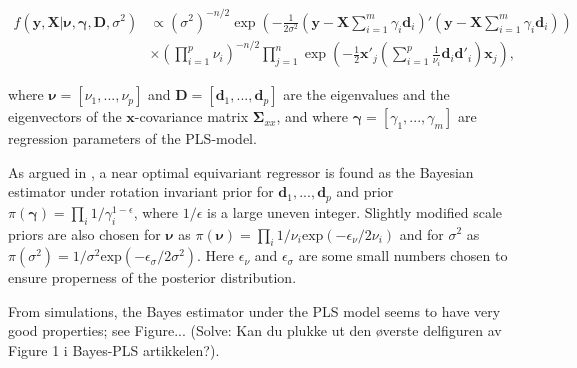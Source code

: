 \documentclass[a4paper, 11pt]{article}
\begin{document}
\begin{equation}
  \label{likelihood}
  \begin{split}
    f(\bm{y},\bm{X}|\bm{\nu}, \bm{\gamma}, \bm{D},\sigma^2) &\propto (\sigma^2)^{-n/2}
    \exp\left(-\frac{1}{2\sigma^2}(\bm{y}-\bm{X}\sum_{i=1}^{m}\gamma_i \bm{d}_i)'(\bm{y}-\bm{X}\sum_{i=1}^{m}\gamma_i \bm{d}_i)\right)\\
    &\times (\prod_{i=1}^{p}\nu_i)^{-n/2}\prod_{j=1}^{n}\exp\left(-\frac{1}{2} \bm{x}'_j(\sum_{i=1}^{p}\frac{1}{\nu_i}\bm{d}_i \bm{d}'_i)\bm{x}_j  \right),
  \end{split}
\end{equation}

where $\bm{\nu}=[\nu_1,...,\nu_p]$ and $\bm{D}=[\bm{d}_1,...,\bm{d}_p]$ are the eigenvalues and the eigenvectors of the $\bm{x}$-covariance matrix $\bm{\Sigma}_{xx}$, and where $\bm{\gamma}=[\gamma_1,...,\gamma_m]$ are regression parameters of the PLS-model.

As argued in \citet{helland2012near}, a near optimal equivariant regressor is
found as the Bayesian estimator under rotation invariant prior for
$\bm{d}_1,...,\bm{d}_p$ and prior $\pi(\bm{\gamma})=\prod_i
1/\gamma_i^{1-\epsilon}$, where $1/\epsilon$ is a large uneven integer. Slightly
modified scale priors are also chosen for $\bm{\nu}$ as $\pi(\bm{\nu}) =\prod_i
1/\nu_i \mathrm{exp}(-\epsilon_\nu/2\nu_i)$ and for $\sigma^2$ as$ \pi(\sigma^2)=1/\sigma^2\mathrm{exp}(-\epsilon_\sigma/2\sigma^2)$. Here $\epsilon_\nu$ and $\epsilon_\sigma$ are some small numbers chosen to ensure properness of the posterior distribution.

From simulations, the Bayes estimator under the PLS model seems to have very good properties; see Figure... (Solve: Kan du plukke ut den \o verste delfiguren av Figure 1 i Bayes-PLS artikkelen?).
\end{document}
